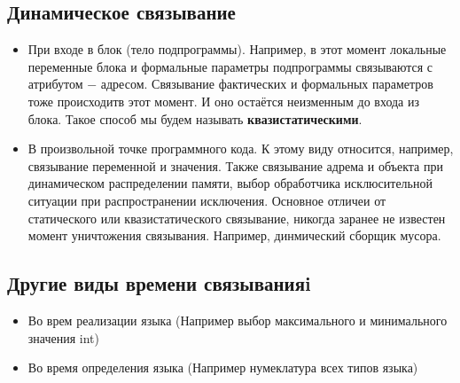 \documentclass[a4paper, 12pt, titlepage, finall]{extreport}
\begin{document}
            \subsection{Динамическое связывание}
                \begin{itemize}
                    \item При входе в блок (тело подпрограммы). Например, в этот момент локальные переменные блока 
                        и формальные параметры подпрограммы связываются с атрибутом $-$ адресом. Связывание фактических и формальных
                        параметров тоже происходитв этот момент. И оно остаётся неизменным до входа из блока. 
                        Такое способ мы будем называть \textbf{квазистатическими}.
                    \item В произвольной точке программного кода. К этому виду относится, например, связывание переменной и значения.
                        Также связывание адрема и объекта при динамическом распределении памяти, выбор обработчика исклюсительной 
                        ситуации при распространении исключения. Основное отличеи от статического или квазистатического связывание,
                        никогда заранее не известен момент уничтожения связывания. Например, динмический сборщик мусора.
                \end{itemize}
            \subsection{Другие виды времени связыванияi}
                \begin{itemize}
                    \item Во врем реализации языка (Например выбор максимального и минимального значения int)
                    \item Во время определения языка (Например нумеклатура всех типов языка)
                \end{itemize}
\end{document}
